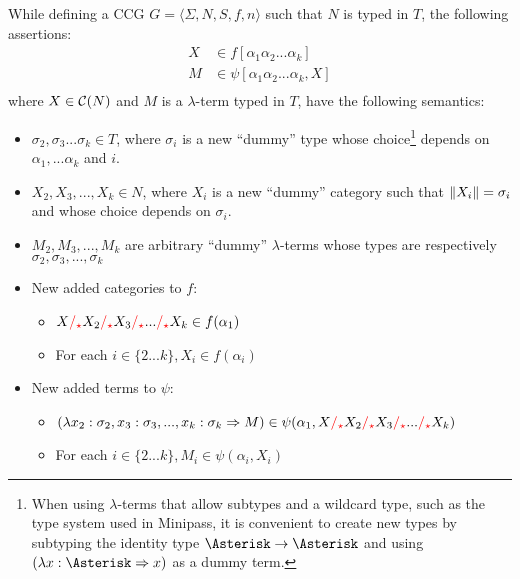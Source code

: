 \documentclass[main.tex]{subfiles}
\begin{document}
\begin{convention}
    \label{hack:phrases}

    While defining a CCG $G = \langle \Sigma, N, S, f, n \rangle$ such that
    $N$ is typed in $T$,
    the following assertions:
    \begin{align*}
        X &\in f[\alpha_1 \alpha_2 ... \alpha_k] \\
        M &\in \psi[\alpha_1 \alpha_2 ... \alpha_k, X] \\
    \end{align*}
    where $X \in \mathcal{C}( N )$ and $M$ is a $\lambda$-term typed in $T$, have
    the following semantics:
    \begin{itemize}
        \item $\sigma_2, \sigma_3 ... \sigma_k \in T$, where $\sigma_i$ is a new ``dummy'' type
            whose choice\footnote{
                When using $\lambda$-terms that allow subtypes and a wildcard type,
                such as the type system used in Minipass, it is
                convenient to create new types by subtyping the identity type
                $\wildcard \tot \wildcard$ and using
                $(\lambda x: \wildcard \abstr x)$ as a dummy term.
            }
            depends on $\alpha_1, ... \alpha_k$ and $i$.
        \item $X_2, X_3, ..., X_k \in N$, where $X_i$ is a new ``dummy'' category
            such that $\|X_i\| = \sigma_i$ and whose choice
            depends on $\sigma_i$.
        \item $M_2, M_3, ..., M_k$ are arbitrary ``dummy'' $\lambda$-terms whose types are
            respectively $\sigma_2, \sigma_3, ..., \sigma_k$
        \item New added categories to $f$:
            \begin{itemize}
                \item $X \textcolor{red}{/_{\star}} X_2 \textcolor{red}{/_{\star}} X_3
                    \textcolor{red}{/_{\star}} ... \textcolor{red}{/_{\star}} X_k \in f(\alpha_1)$
                \item For each $i \in \{ 2 ... k \}, X_i \in f(\alpha_i)$
            \end{itemize}
        \item New added terms to $\psi$:
            \begin{itemize}
                \item $(\lambda x_2: \sigma_2, x_3: \sigma_3, ..., x_k: \sigma_k \Rightarrow
                    M) \in \psi(\alpha_1, X \textcolor{red}{/_{\star}} X_2 \textcolor{red}{/_{\star}} X_3
                    \textcolor{red}{/_{\star}} ... \textcolor{red}{/_{\star}} X_k)$
                \item For each $i \in \{ 2 ... k \}, M_i \in \psi(\alpha_i, X_i)$
            \end{itemize}
    \end{itemize}
\end{convention}
\end{document}
